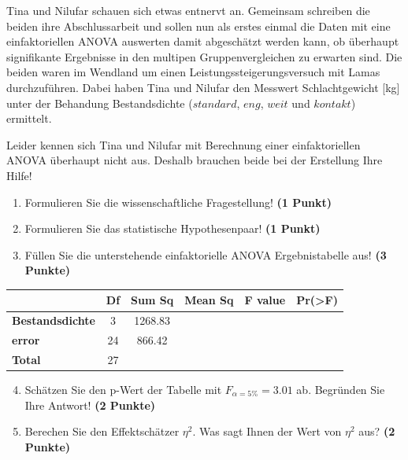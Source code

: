 \documentclass[a4paper, 9pt]{scrartcl}\usepackage[]{graphicx}\usepackage[]{xcolor}
\begin{document}
Tina und Nilufar schauen sich etwas entnervt an. Gemeinsam schreiben die beiden ihre Abschlussarbeit und sollen nun als erstes einmal die Daten mit eine einfaktoriellen ANOVA auswerten damit abgeschätzt werden kann, ob überhaupt signifikante Ergebnisse in den multipen Gruppenvergleichen zu erwarten sind. Die beiden waren im Wendland um einen Leistungssteigerungsversuch mit Lamas durchzuführen. Dabei haben Tina und Nilufar den Messwert Schlachtgewicht [kg] unter der Behandung Bestandsdichte ($standard$, $eng$, $weit$ und $kontakt$) ermittelt.



\vspace{1ex}

Leider kennen sich Tina und Nilufar mit Berechnung einer einfaktoriellen ANOVA überhaupt nicht aus. Deshalb brauchen beide bei der Erstellung Ihre Hilfe! 

\begin{enumerate}
  \item Formulieren Sie die wissenschaftliche Fragestellung! \textbf{(1 Punkt)}
  \item Formulieren Sie das statistische Hypothesenpaar! \textbf{(1 Punkt)}
\item Füllen Sie die unterstehende einfaktorielle ANOVA Ergebnistabelle aus! \textbf{(3 Punkte)}
\end{enumerate}

\vspace{1Ex}

\begin{center}
  \Large
  \begin{tabular}{lccccp{3cm}}
\toprule
     & \textbf{Df} & \textbf{Sum Sq} & \textbf{Mean Sq} & \textbf{F value} & \textbf{Pr(>F)} \strut\\
    \midrule
   \textbf{Bestandsdichte}  & 3 & 1268.83 &  &  &  \strut\\
   \textbf{error}  & 24 & 866.42 &  &  &  \strut\\
   \textbf{Total}  & 27 &  &  &  &  \strut\\
\bottomrule
  \end{tabular}
\end{center}

\vspace{1Ex}

\begin{enumerate}
  \setcounter{enumi}{3}
\item Schätzen Sie den p-Wert der Tabelle mit $F_{\alpha = 5\%} = 3.01$ ab. Begründen Sie Ihre Antwort! \textbf{(2 Punkte)}
\item Berechen Sie den Effektschätzer $\eta^2$. Was sagt Ihnen der Wert von $\eta^2$ aus? \textbf{(2 Punkte)}
\end{enumerate}
\end{document}

